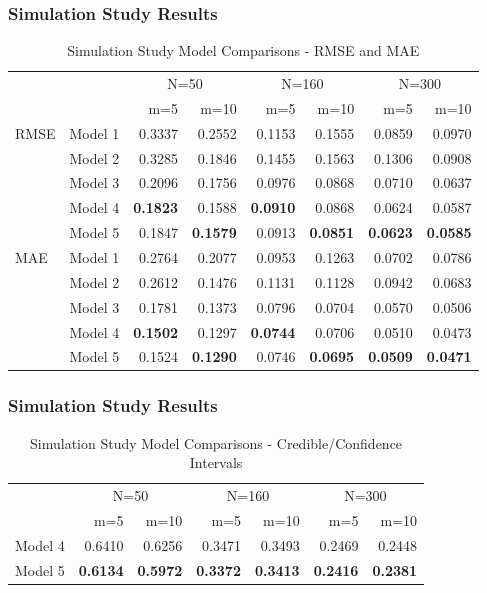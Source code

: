 \documentclass{beamer}
\begin{document}
\begin{frame}
\frametitle{Simulation Study Results}
\begin{table}[htb]
\renewcommand\thetable{2.1}
       \footnotesize
    \centering
        \caption{Simulation Study Model Comparisons - RMSE and MAE}
    \begin{tabular}{l|l|r|r|r|r|r|r}
    & & \multicolumn{2}{c}{N=50} & \multicolumn{2}{c}{N=160} & \multicolumn{2}{c}{N=300} \\
     & & m=5 & m=10 & m=5 & m=10 & m=5 & m=10 \\
    \hline
    \hline
    RMSE & Model 1 & 0.3337 & 0.2552 & 0.1153 & 0.1555 & 0.0859 & 0.0970  \\
      & Model 2 & 0.3285 & 0.1846 & 0.1455 & 0.1563 & 0.1306 & 0.0908  \\ 
      & Model 3 & 0.2096 & 0.1756 & 0.0976 & 0.0868 & 0.0710 & 0.0637 \\
      & Model 4 & \textbf{0.1823} & 0.1588 & \textbf{0.0910} & 0.0868 & 0.0624 & 0.0587  \\
      & Model 5 & 0.1847 & \textbf{0.1579} & 0.0913 & \textbf{0.0851} & \textbf{0.0623} & \textbf{0.0585}  \\  
      \hline
    MAE & Model 1 & 0.2764 & 0.2077 & 0.0953 & 0.1263 & 0.0702 & 0.0786 \\
      & Model 2 & 0.2612 & 0.1476 & 0.1131 & 0.1128 & 0.0942 & 0.0683 \\
       & Model 3 & 0.1781 & 0.1373 & 0.0796 & 0.0704 & 0.0570 & 0.0506 \\
              & Model 4 & \textbf{0.1502} & 0.1297 & \textbf{0.0744} & 0.0706 & 0.0510 & 0.0473 \\
      & Model 5 & 0.1524 & \textbf{0.1290} & 0.0746 & \textbf{0.0695} & \textbf{0.0509} & \textbf{0.0471} \\
    \end{tabular}
    \label{symcomp}
\end{table}
\end{frame}

\begin{frame}
\frametitle{Simulation Study Results}
\begin{table}[htb]
\renewcommand\thetable{2.2}
       \footnotesize
    \centering
        \caption{Simulation Study Model Comparisons - Credible/Confidence Intervals}
    \begin{tabular}{l|r|r|r|r|r|r}
    & \multicolumn{2}{c}{N=50} & \multicolumn{2}{c}{N=160} & \multicolumn{2}{c}{N=300} \\
     & m=5 & m=10 & m=5 & m=10 & m=5 & m=10 \\
    \hline
    \hline
       Model 4 & 0.6410 & 0.6256 & 0.3471 & 0.3493 & 0.2469 & 0.2448 \\
      Model 5 & \textbf{0.6134} & \textbf{0.5972} & \textbf{0.3372} & \textbf{0.3413} & \textbf{0.2416} & \textbf{0.2381} \\
          \end{tabular}
    \label{symcompci}
\end{table}
\end{frame}
\end{document}
